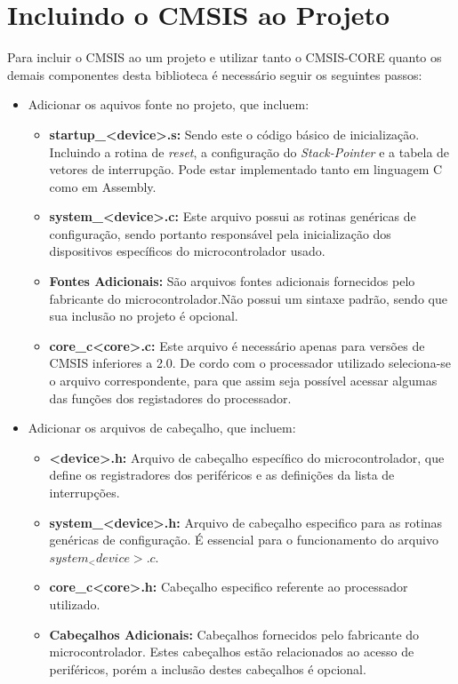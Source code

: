 \section{Incluindo o CMSIS ao Projeto}

Para incluir o CMSIS ao um projeto e utilizar tanto  o CMSIS-CORE quanto os demais componentes desta biblioteca é necessário seguir os seguintes passos: 

\begin{itemize}
	
	\item Adicionar os aquivos fonte no projeto, que incluem:
	\begin{itemize}
		\item \textbf{startup\_<device>.s:}  Sendo este o código básico de inicialização. Incluindo a rotina de \emph{reset}, a configuração do \emph{Stack-Pointer} e a tabela de vetores de interrupção. Pode estar implementado tanto em linguagem C como em Assembly.
		\item \textbf{system\_<device>.c:} Este arquivo possui as rotinas genéricas de configuração, sendo portanto responsável pela inicialização dos dispositivos específicos do microcontrolador usado.
		\item  \textbf{Fontes Adicionais:} São arquivos fontes adicionais fornecidos pelo fabricante do microcontrolador.Não possui um sintaxe padrão, sendo que sua inclusão no projeto é opcional. 
		\item \textbf{core\_c<core>.c:} Este arquivo é necessário apenas para versões de CMSIS inferiores a 2.0. De cordo com o processador utilizado seleciona-se o arquivo correspondente, para que assim seja possível  acessar algumas das funções dos  registadores do processador.
	\end{itemize}
	
	\item Adicionar os arquivos de cabeçalho, que incluem:
	\begin{itemize}
		\item \textbf{<device>.h:}  Arquivo de cabeçalho específico do microcontrolador,  que define os registradores dos periféricos e as definições da lista de interrupções. 
		\item \textbf{system\_<device>.h:} Arquivo de cabeçalho especifico para as rotinas genéricas de configuração. É essencial para o funcionamento do arquivo $system_<device>.c$.
		\item \textbf{core\_c<core>.h:} Cabeçalho especifico referente ao processador utilizado.
		\item  \textbf{Cabeçalhos Adicionais:} Cabeçalhos fornecidos pelo fabricante do microcontrolador. Estes cabeçalhos estão relacionados ao acesso de periféricos, porém a inclusão destes cabeçalhos é opcional.  
	\end{itemize}
\end{itemize}




